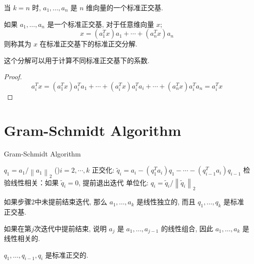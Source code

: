 \begin{definition}[$n$维向量的一个标准正交基]
    当 $ k=n $ 时,  $ a_{1}, \ldots, a_{n} $ 是 $ n $ 维向量的一个标准正交基. 
\end{definition}

\begin{definition}[ $ x $ 在标准正交基下的标准正交分解]
    如果 $ a_{1}, \ldots, a_{n} $ 是一个标准正交基, 对于任意维向量 $ x $;
$$
x=\left(a_{1}^{T} x\right) a_{1}+\cdots+\left(a_{n}^{T} x\right) a_{n}
$$
则称其为 $ x $ 在标准正交基下的标准正交分解. 
\end{definition}

    这个分解可以用于计算不同标准正交基下的系数. 

\begin{proof}
    $$ a_{i}^{T} x=\left(a_{1}^{T} x\right) a_{i}^{T} a_{1}+\cdots+\left(a_{i}^{T} x\right) a_{i}^{T} a_{i}+\cdots+\left(a_{n}^{T} x\right) a_{i}^{T} a_{n}=a_{i}^{T} x $$
\end{proof}

\section{Gram-Schmidt Algorithm}

\begin{algorithm}[htbp]
    \caption{Gram-Schmidt Algorithm}
    $ q_{1}=a_{1} /\left\|a_{1}\right\|_{2} $\;
    \While(){$i=2,\cdots,k$}{
        正交化: $ \widetilde{q}_{i}=a_{i}-\left(q_{1}^{T} a_{i}\right) q_{1}-\cdots-\left(q_{i-1}^{T} a_{i}\right) q_{i-1} $\;
        检验线性相关：如果 $ \widetilde{q}_{i}=0 $, 提前退出迭代\;
        单位化: $ q_{i}=\widetilde{q}_{i} /\left\|\widetilde{q}_{i}\right\|_{2} $\;
    }
\end{algorithm}

如果步骤2中未提前结束迭代, 那么 $ a_{1}, \ldots, a_{k} $ 是线性独立的, 而且 $ q_{1}, \ldots, q_{k} $ 是标准正交基. 

如果在第$j$次迭代中提前结束, 说明 $ a_{j} $ 是 $ a_{1}, \ldots, a_{j-1} $ 的线性组合, 因此 $ a_{1}, \ldots, a_{k} $ 是线性相关的. 

\begin{theorem}
    $q_{1}, \ldots, q_{i-1}, q_{i} $ 是标准正交的. 
\end{theorem}

